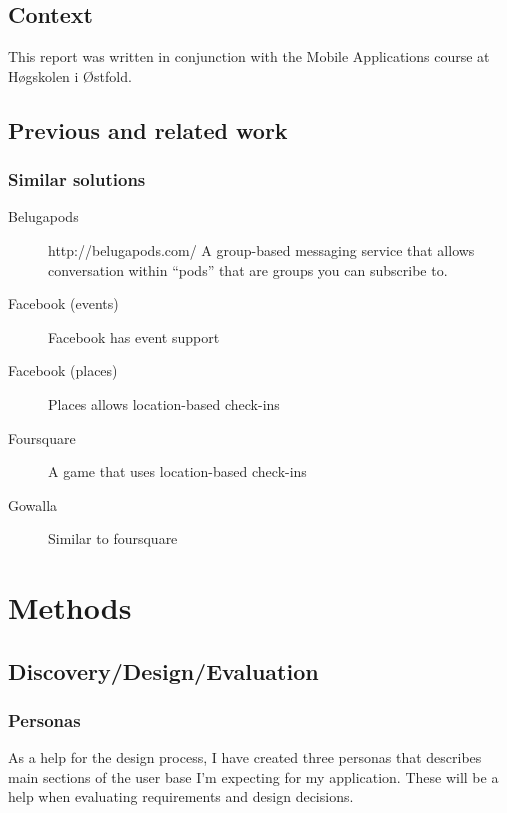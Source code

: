 \documentclass[]{report}
\begin{document}
\section{Context}

This report was written in conjunction with the Mobile Applications course at
H\o{}gskolen i \O{}stfold\cite{site:mobapp}.

\section{Previous and related work}

\subsection{Similar solutions}


\begin{description}
\item[Belugapods] http://belugapods.com/ A group-based messaging service that
  allows conversation within ``pods'' that are groups you can subscribe to.
\item[Facebook (events)] Facebook has event support
\item[Facebook (places)] Places allows location-based check-ins
\item[Foursquare] A game that uses location-based check-ins
\item[Gowalla] Similar to foursquare
\end{description}

\chapter{Methods}

\section{Discovery/Design/Evaluation}

\subsection{Personas}

As a help for the design process, I have created three personas that describes
main sections of the user base I'm expecting for my application. These will be a
help when evaluating requirements and design decisions.
\end{document}
